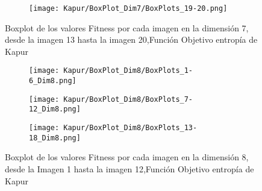 \documentclass[conference]{IEEEtran}
\begin{document}
\begin{figure}
    \centering
    \begin{subfigure}{0.5\textwidth}
        \texttt{[image: Kapur/BoxPlot\_Dim7/BoxPlots\_19-20.png]}
        \vspace{-150pt} %
    \end{subfigure}
    \caption{Boxplot de los valores Fitness por cada imagen en la dimensión 7, desde la imagen 13 hasta la imagen 20,Función Objetivo entropía de Kapur}
    \label{fig:imagenes}    
\end{figure}

\begin{figure}
    \centering

    \begin{subfigure}{0.5\textwidth}
        \texttt{[image: Kapur/BoxPlot\_Dim8/BoxPlots\_1-6\_Dim8.png]}
    \end{subfigure}
    
    \begin{subfigure}{0.5\textwidth}
        \texttt{[image: Kapur/BoxPlot\_Dim8/BoxPlots\_7-12\_Dim8.png]}
    \end{subfigure}
         \begin{subfigure}{0.5\textwidth}
        \texttt{[image: Kapur/BoxPlot\_Dim8/BoxPlots\_13-18\_Dim8.png]}
    \end{subfigure}
    \caption{Boxplot de los valores Fitness por cada imagen en la dimensión 8, desde la Imagen 1 hasta la imagen 12,Función Objetivo entropía de Kapur}
\label{fig:imagenes}    
\end{figure}
\end{document}
